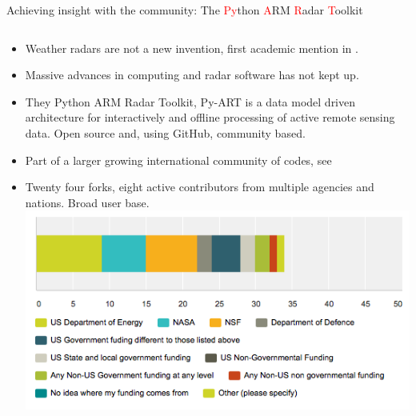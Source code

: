 \documentclass[final]{beamer}
\begin{document}
\begin{frame}{}
\begin{columns}[t]
\begin{column}{.3\linewidth}
         
        \begin{block}{Achieving insight with the community: The \textcolor{red}{Py}thon \textcolor{red}{A}RM \textcolor{red}{R}adar \textcolor{red}{T}oolkit}
                \begin{columns}[t]
                    \begin{column}{.55\linewidth}
                        \begin{itemize}
                            \item Weather radars are not a new invention, first academic mention in \citet{bent_radar_1943}.
                            \item Massive advances in computing and radar software has not kept up.
                            \item They Python ARM Radar Toolkit, Py-ART  is a data model driven architecture for interactively and 
                            offline processing of active remote sensing data. Open source and, using GitHub, community based.
                            \item Part of a larger growing international community of codes, see \citet{heistermann_emergence_2014}
                            \item Twenty four forks, eight active contributors from multiple agencies and nations. Broad user base. 
                             \includegraphics[width=0.8\linewidth]{figures/survey}\\[1ex]                        
                       \end{itemize}
                   \end{column}
\end{columns}
\end{block}
\end{column}
\end{columns}
\end{frame}
\end{document}
